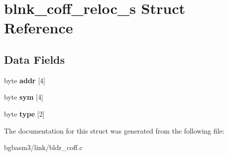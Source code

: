 \hypertarget{structblnk__coff__reloc__s}{\section{blnk\-\_\-coff\-\_\-reloc\-\_\-s Struct Reference}
\label{structblnk__coff__reloc__s}
}
\subsection*{Data Fields}
\begin{DoxyCompactItemize}
\item 
\hypertarget{structblnk__coff__reloc__s_a2e4af86566574e1b7cc875225e82a220}{byte {\bfseries addr} \mbox{[}4\mbox{]}}\label{structblnk__coff__reloc__s_a2e4af86566574e1b7cc875225e82a220}

\item 
\hypertarget{structblnk__coff__reloc__s_a6860bbadd68ebd66f54e4ad018859e82}{byte {\bfseries sym} \mbox{[}4\mbox{]}}\label{structblnk__coff__reloc__s_a6860bbadd68ebd66f54e4ad018859e82}

\item 
\hypertarget{structblnk__coff__reloc__s_a5a6b45e3e5b91d914605a779ba1b21b3}{byte {\bfseries type} \mbox{[}2\mbox{]}}\label{structblnk__coff__reloc__s_a5a6b45e3e5b91d914605a779ba1b21b3}

\end{DoxyCompactItemize}


The documentation for this struct was generated from the following file\-:\begin{DoxyCompactItemize}
\item 
bgbasm3/link/bldr\-\_\-coff.\-c\end{DoxyCompactItemize}
